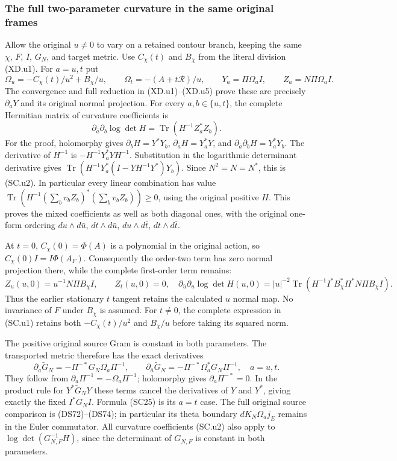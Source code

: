 
\subsubsection{The full two-parameter curvature in the same original frames}
Allow the original $u\ne0$ to vary on a retained contour branch,
keeping the same $\chi$, $F$, $I$, $G_N$, and target metric.
Use $C_\chi(t)$ and $B_\chi$ from the literal division (XD.u1).
For $a=u,t$ put
\[
 \Omega_u=-C_\chi(t)/u^2+B_\chi/u,
 \qquad\Omega_t=-(A+t\mathcal R)/u,
 \qquad Y_a=\Pi\Omega_a I,
 \qquad Z_a=N\Pi\Omega_a I.                         \tag{SC.u1}
\]
The convergence and full reduction in (XD.u1)--(XD.u5) prove
these are precisely $\partial_aY$ and its original normal
projection.  For every $a,b\in\{u,t\}$, the complete Hermitian
matrix of curvature coefficients is
\[
 \boxed{\partial_{\bar a}\partial_b\log\det H
          =\operatorname{Tr}(H^{-1}Z_a^*Z_b).}         \tag{SC.u2}
\]
For the proof, holomorphy gives $\partial_bH=Y^*Y_b$,
$\partial_{\bar a}H=Y_a^*Y$, and
$\partial_{\bar a}\partial_bH=Y_a^*Y_b$.
The derivative of $H^{-1}$ is
$-H^{-1}Y_a^*YH^{-1}$.  Substitution in the logarithmic
determinant derivative gives
$\operatorname{Tr}(H^{-1}Y_a^*(I-YH^{-1}Y^*)Y_b)$.
Since $N^2=N=N^*$, this is (SC.u2).  In particular every
linear combination has value
$\operatorname{Tr}(H^{-1}(\sum_b v_bZ_b)^*
(\sum_b v_bZ_b))\ge0$, using the original positive $H$.
This proves the mixed coefficients as well as both diagonal
ones, with the original one-form ordering
$du\wedge d\bar u$, $dt\wedge d\bar u$,
$du\wedge d\bar t$, $dt\wedge d\bar t$.

At $t=0$, $C_\chi(0)=\Phi(A)$ is a polynomial in the
original action, so $C_\chi(0)I=I\Phi(A_F)$.
Consequently the order-two term has zero normal projection
there, while the complete first-order term remains:
\[
 Z_u(u,0)=u^{-1}N\Pi B_\chi I,\qquad Z_t(u,0)=0,
 \quad
 \partial_{\bar u}\partial_u\log\det H(u,0)
 =|u|^{-2}\operatorname{Tr}
       (H^{-1}I^*B_\chi^*\Pi^*N\Pi B_\chi I).
 \tag{SC.u3}
\]
Thus the earlier stationary $t$ tangent retains the calculated
$u$ normal map.  No invariance of $F$ under $B_\chi$ is assumed.
For $t\ne0$, the complete expression in (SC.u1) retains both
$-C_\chi(t)/u^2$ and $B_\chi/u$ before taking its squared norm.

The positive original source Gram is constant in both parameters.
The transported metric therefore has the exact derivatives
\[
 \partial_a\widetilde G_N
       =-\Pi^{-*}G_N\Omega_a\Pi^{-1},\qquad
 \partial_{\bar a}\widetilde G_N
       =-\Pi^{-*}\Omega_a^*G_N\Pi^{-1},\quad a=u,t.
 \tag{SC.u4}
\]
They follow from $\partial_a\Pi^{-1}=-\Omega_a\Pi^{-1}$;
holomorphy gives $\partial_a\Pi^{-*}=0$.
In the product rule for $Y^*\widetilde G_NY$ these terms
cancel the derivatives of $Y$ and $Y^*$, giving exactly the
fixed $I^*G_NI$.  Formula (SC25) is its $a=t$ case.
The full original source comparison is (DS72)--(DS74);
in particular its theta boundary $dK_N\Omega_a j_E$ remains
in the Euler commutator.  All curvature coefficients (SC.u2)
also apply to $\log\det(G_{N,F}^{-1}H)$, since the determinant
of $G_{N,F}$ is constant in both parameters.

